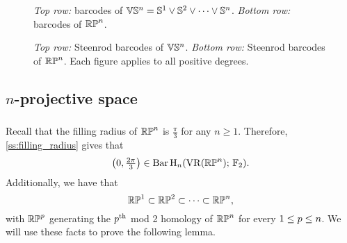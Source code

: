 
\begin{figure}
	\centering
	
	\caption{\emph{Top row:} barcodes of $\mathbb{V}\mathbb{S}^n = \mathbb{S}^1 \vee \mathbb{S}^2 \vee \dots \vee \mathbb{S}^n$. \emph{Bottom row:} barcodes of $\mathbb{RP}^n$.}
	\label{fig:barcodes}
\end{figure}

\begin{figure}
	\centering
	
	\caption{\emph{Top row:} Steenrod barcodes of $\mathbb{V}\mathbb{S}^n$. \emph{Bottom row:} Steenrod barcodes of $\mathbb{RP}^n$. Each figure applies to all positive degrees.}
	\label{fig:sq barcodes}
\end{figure}

\subsection{$n$-projective space}

\subsubsection{}\label{prop:RPn bar}

Recall that the filling radius of $\mathbb{RP}^n$ is $\frac{\pi}{3}$ for any $n \geq 1$.
Therefore, \cref{ss:filling_radius} gives that
\[
\left(0, \tfrac{2\pi}{3}\right) \in \operatorname{Bar} \operatorname{H}_{n}(\operatorname{VR}(\mathbb{RP}^n);\,{\mathbb{F}_2}).
\]
Additionally, we have that
\[
\mathbb{RP}^1 \subset \mathbb{RP}^2 \subset \dots \subset \mathbb{RP}^n,
\]
with $\mathbb{RP}^p$ generating the $p^{\mathrm{th}}$ mod 2 homology of $\mathbb{RP}^n$ for every $1 \leq p \leq n$.
We will use these facts to prove the following lemma. 



